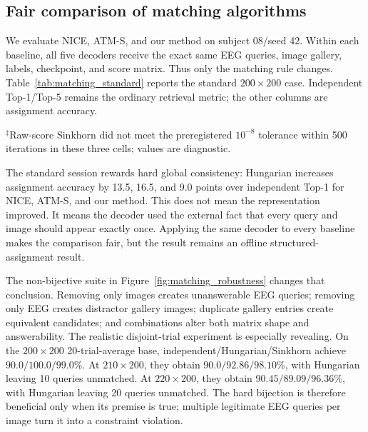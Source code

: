 \documentclass{article}
\begin{document}
\subsection{Fair comparison of matching algorithms}
\label{sec:matching_results}

We evaluate NICE, ATM-S, and our method on subject 08/seed 42. Within each baseline, all five decoders receive the exact same EEG queries, image gallery, labels, checkpoint, and score matrix. Thus only the matching rule changes. Table~\ref{tab:matching_standard} reports the standard $200\times200$ case. Independent Top-1/Top-5 remains the ordinary retrieval metric; the other columns are assignment accuracy.

\begin{table}[t]
\centering
\caption{Standard $200\times200$ fairness suite on subject 08/seed 42 (\%). Structured columns are assignment accuracy, not retrieval Top-1.}
\label{tab:matching_standard}
\vspace{2pt}

{\footnotesize $^{\ddagger}$Raw-score Sinkhorn did not meet the preregistered $10^{-8}$ tolerance within 500 iterations in these three cells; values are diagnostic.}
\end{table}

The standard session rewards hard global consistency: Hungarian increases assignment accuracy by 13.5, 16.5, and 9.0 points over independent Top-1 for NICE, ATM-S, and our method. This does not mean the representation improved. It means the decoder used the external fact that every query and image should appear exactly once. Applying the same decoder to every baseline makes the comparison fair, but the result remains an offline structured-assignment result.

The non-bijective suite in Figure~\ref{fig:matching_robustness} changes that conclusion. Removing only images creates unanswerable EEG queries; removing only EEG creates distractor gallery images; duplicate gallery entries create equivalent candidates; and combinations alter both matrix shape and answerability. The realistic disjoint-trial experiment is especially revealing. On the $200\times200$ 20-trial-average base, independent/Hungarian/Sinkhorn achieve $90.0/100.0/99.0\%$. At $210\times200$, they obtain $90.0/92.86/98.10\%$, with Hungarian leaving 10 queries unmatched. At $220\times200$, they obtain $90.45/89.09/96.36\%$, with Hungarian leaving 20 queries unmatched. The hard bijection is therefore beneficial only when its premise is true; multiple legitimate EEG queries per image turn it into a constraint violation.
\end{document}
